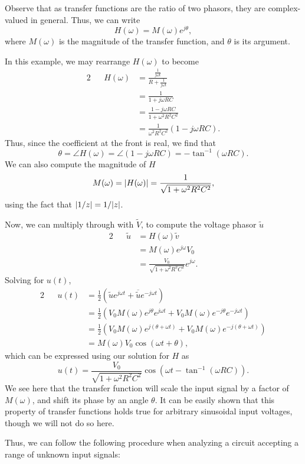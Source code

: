\documentclass[letterpaper]{article}
\theoremstyle{remark}
\renewcommand{\tilde}[1]{\widetilde{#1}}
\DeclarePairedDelimiter\abs{\lvert}{\rvert}%
\newcommand{\eqn}[1]{\begin{alignat*}{2}#1\end{alignat*}}
\begin{document}
Observe that as transfer functions are the ratio of two phasors, they are complex-valued in general. Thus, we can write
\[
    H(\omega) = M(\omega) e^{j \theta},
\]
where $M(\omega)$ is the magnitude of the transfer function, and $\theta$ is its argument.

In this example, we may rearrange $H(\omega)$ to become
\eqn{
    && H(\omega) &= \frac{\frac{1}{j\omega t}}{R + \frac{1}{j\omega t}} \\
    &&&= \frac{1}{1 + j\omega RC} \\
    &&&= \frac{1 - j\omega RC}{1 + \omega^2R^2C^2} \\
    &&&= \frac{1}{\omega^2R^2C^2} (1 - j\omega RC).
}
Thus, since the coefficient at the front is real, we find that
\[
    \theta = \angle H(\omega) = \angle(1 - j\omega RC) = -\tan^{-1}(\omega RC).
\]
We can also compute the magnitude of $H$
\[
    M(\omega) = \abs{H(\omega)} = \frac{1}{\sqrt{1 + \omega^2 R^2C^2}},
\]
using the fact that $\abs{1/z} = 1 / \abs{z}$.

Now, we can multiply through with $\tilde{V}$, to compute the voltage phasor $\tilde{u}$
\eqn{
    && \tilde{u} &= H(\omega) \tilde{v} \\
    &&&= M(\omega) e^{j\omega} V_0 \\
    &&&= \frac{V_0}{\sqrt{1 + \omega^2R^2C^2}} e^{j\omega}.
}
Solving for $u(t)$,
\eqn{
    && u(t) &= \frac{1}{2} \left( \tilde{u}e^{j\omega t} + \overline{\tilde{u}}e^{-j\omega t} \right) \\
    &&&= \frac{1}{2} \left(V_0M(\omega) e^{j\theta} e^{j\omega t} + V_0M(\omega) e^{-j\theta} e^{-j\omega t} \right) \\
    &&&= \frac{1}{2} \left(V_0M(\omega) e^{j(\theta + \omega t)} + V_0M(\omega) e^{-j(\theta + \omega t)} \right) \\
    &&&= M(\omega) V_0 \cos{(\omega t + \theta)},
}
which can be expressed using our solution for $H$ as
\[
    u(t) = \frac{V_0}{\sqrt{1 + \omega^2 R^2C^2}} \cos{(\omega t -\tan^{-1}(\omega RC))}.
\]
We see here that the transfer function will scale the input signal by a factor of $M(\omega)$, and shift its phase by an angle $\theta$. It can be easily shown that this property of transfer functions holds true for arbitrary sinusoidal input voltages, though we will not do so here.

Thus, we can follow the following procedure when analyzing a circuit accepting a range of unknown input signals:
\end{document}
